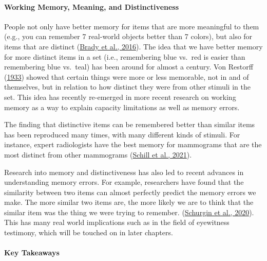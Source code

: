 \documentclass[
]{krantz}
\begin{document}
\hypertarget{working-memory-meaning-and-distinctiveness}{%
\paragraph*{Working Memory, Meaning, and Distinctiveness}\label{working-memory-meaning-and-distinctiveness}}

People not only have better memory for items that are more meaningful to them (e.g., you can remember 7 real-world objects better than 7 colors), but also for items that are distinct (\protect\hyperlink{ref-Brady2016}{Brady et al., 2016}). The idea that we have better memory for more distinct items in a set (i.e., remembering blue vs.~red is easier than remembering blue vs.~teal) has been around for almost a century. Von Restorff (\protect\hyperlink{ref-Von1933}{1933}) showed that certain things were more or less memorable, not in and of themselves, but in relation to how distinct they were from other stimuli in the set. This idea has recently re-emerged in more recent research on working memory as a way to explain capacity limitations as well as memory errors.

The finding that distinctive items can be remembered better than similar items has been reproduced many times, with many different kinds of stimuli. For instance, expert radiologists have the best memory for mammograms that are the most distinct from other mammograms (\protect\hyperlink{ref-Schill2021}{Schill et al., 2021}).

Research into memory and distinctiveness has also led to recent advances in understanding memory errors. For example, researchers have found that the similarity between two items can almost perfectly predict the memory errors we make. The more similar two items are, the more likely we are to think that the similar item was the thing we were trying to remember. (\protect\hyperlink{ref-Schurgin2020}{Schurgin et al., 2020}). This has many real world implications such as in the field of eyewitness testimony, which will be touched on in later chapters.

\hypertarget{key-takeaways-3}{%
\paragraph*{Key Takeaways}\label{key-takeaways-3}}
\end{document}
